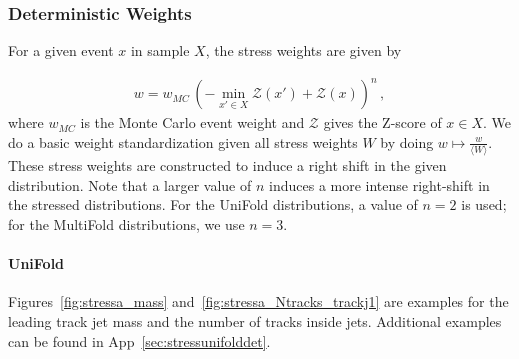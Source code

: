 \clearpage

\subsubsection{Deterministic Weights}
\label{sec:stress:deterministic}

For a given event $x$ in sample $X$, the stress weights are given by 

\begin{align}
\label{eq:stressweights}
w = w_{MC}\,(-\min_{x'\in X}\mathcal{Z}(x')+\mathcal{Z}(x))^n\,,
\end{align}
%
where $w_{MC}$ is the Monte Carlo event weight and $\mathcal{Z}$ gives the Z-score of $x\in X$. We do a basic weight standardization given all stress weights $W$ by doing $w\mapsto\frac{w}{\langle W\rangle}$. These stress weights are constructed to induce a right shift in the given distribution. Note that a larger value of $n$ induces a more intense right-shift in the stressed distributions.  For the UniFold distributions, a value of $n=2$ is used; for the MultiFold distributions, we use $n=3$.

\paragraph{UniFold}

Figures~\ref{fig:stressa_mass} and~\ref{fig:stressa_Ntracks_trackj1} are examples for the leading track jet mass and the number of tracks inside jets.  Additional examples can be found in App~\ref{sec:stressunifolddet}.

